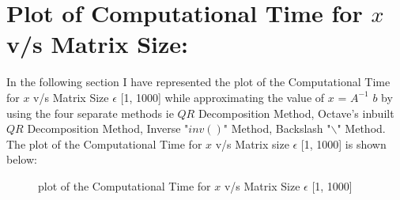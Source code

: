 \documentclass[12pt,a4paper]{article}
\begin{document}
\section{Plot of Computational Time for $x$ v/s Matrix Size:}
In the following section I have represented the plot of the Computational Time for $x$ v/s Matrix Size  $\epsilon$ [1, 1000] while approximating the value of $x$ = $A^{-1}$ $b$ by using the four separate methods ie $QR$ Decomposition Method, Octave’s inbuilt $QR$ Decomposition Method, Inverse "$inv()$" Method, Backslash "$\backslash$" Method. The plot of the Computational Time for $x$ v/s Matrix size  $\epsilon$ [1, 1000] is shown below:
\clearpage
\begin{figure}[!ht]
	\begin{center}
	\end{center}
	\caption{plot of the Computational Time for $x$ v/s Matrix Size  $\epsilon$ [1, 1000]}
\end{figure}
\bigskip
\end{document}
